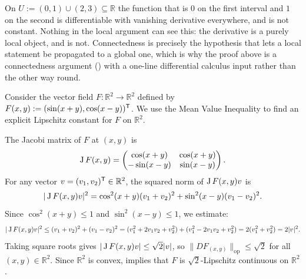 \begin{remark}
\label{rem:zero_differential_needs_connected}
On $U := (0,1) \cup (2,3) \subseteq \mathbb{R}$ the function that is $0$ on the first interval and
$1$ on the second is differentiable with vanishing derivative everywhere, and is not constant.
Nothing in the local argument can see this: the derivative is a purely local object, and
 is not. Connectedness is precisely the hypothesis that lets a local statement be
propagated to a global one, which is why the proof above is a connectedness argument
() with a one-line differential calculus input
rather than the other way round.
\end{remark}

\begin{example}
\label{ex:mvi_lipschitz_example}
Consider the vector field $F : \mathbb{R}^2 \to \mathbb{R}^2$ defined by $F(x,y) := (\sin(x+y), \cos(x-y))^{\mathsf{T}}$. We use the Mean Value Inequality to find an explicit Lipschitz constant for $F$ on $\mathbb{R}^2$.

The Jacobi matrix of $F$ at $(x,y)$ is
\[
\operatorname{J} F(x,y) = \begin{pmatrix} \cos(x+y) & \cos(x+y) \\ -\sin(x-y) & \sin(x-y) \end{pmatrix}.
\]
For any vector $v = (v_1, v_2)^{\mathsf{T}} \in \mathbb{R}^2$, the squared norm of $\operatorname{J} F(x,y) v$ is
\[
|\operatorname{J} F(x,y) v|^2 = \cos^2(x+y)(v_1+v_2)^2 + \sin^2(x-y)(v_1-v_2)^2.
\]
Since $\cos^2(x+y) \leq 1$ and $\sin^2(x-y) \leq 1$, we estimate:
\[
|\operatorname{J} F(x,y) v|^2 \leq (v_1+v_2)^2 + (v_1-v_2)^2 = (v_1^2 + 2v_1v_2 + v_2^2) + (v_1^2 - 2v_1v_2 + v_2^2) = 2(v_1^2 + v_2^2) = 2|v|^2.
\]
Taking square roots gives $|\operatorname{J} F(x,y) v| \leq \sqrt{2}|v|$, so $\|DF_{(x,y)}\|_{\mathrm{op}} \leq \sqrt{2}$ for all $(x,y) \in \mathbb{R}^2$. Since $\mathbb{R}^2$ is convex,  implies that $F$ is $\sqrt{2}$-Lipschitz continuous on $\mathbb{R}^2$.
\end{example}


